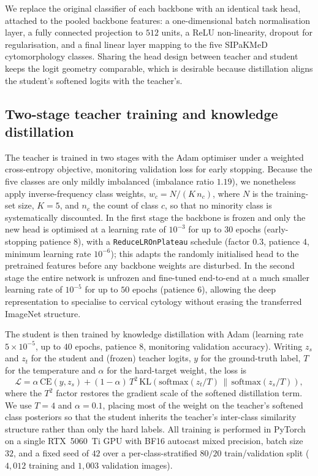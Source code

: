 \documentclass[twocolumn]{article}
\begin{document}
We replace the original classifier of each backbone with an identical task head, attached to the pooled backbone features: a one-dimensional batch normalisation layer, a fully connected projection to $512$ units, a ReLU non-linearity, dropout for regularisation, and a final linear layer mapping to the five SIPaKMeD cytomorphology classes. Sharing the head design between teacher and student keeps the logit geometry comparable, which is desirable because distillation aligns the student's softened logits with the teacher's.

\subsection{Two-stage teacher training and knowledge distillation}
The teacher is trained in two stages with the Adam optimiser under a weighted cross-entropy objective, monitoring validation loss for early stopping. Because the five classes are only mildly imbalanced (imbalance ratio $1.19$), we nonetheless apply inverse-frequency class weights, $w_c = N / (K\,n_c)$, where $N$ is the training-set size, $K=5$, and $n_c$ the count of class $c$, so that no minority class is systematically discounted. In the first stage the backbone is frozen and only the new head is optimised at a learning rate of $10^{-3}$ for up to $30$ epochs (early-stopping patience $8$), with a \texttt{ReduceLROnPlateau} schedule (factor $0.3$, patience $4$, minimum learning rate $10^{-6}$); this adapts the randomly initialised head to the pretrained features before any backbone weights are disturbed. In the second stage the entire network is unfrozen and fine-tuned end-to-end at a much smaller learning rate of $10^{-5}$ for up to $50$ epochs (patience $6$), allowing the deep representation to specialise to cervical cytology without erasing the transferred ImageNet structure.

The student is then trained by knowledge distillation \citep{hinton2015distilling} with Adam (learning rate $5\times10^{-5}$, up to $40$ epochs, patience $8$, monitoring validation accuracy). Writing $z_s$ and $z_t$ for the student and (frozen) teacher logits, $y$ for the ground-truth label, $T$ for the temperature and $\alpha$ for the hard-target weight, the loss is
\begin{equation}
\mathcal{L} = \alpha\,\mathrm{CE}\!\left(y, z_s\right) + (1-\alpha)\,T^{2}\,\mathrm{KL}\!\left(\mathrm{softmax}\!\left(z_t/T\right)\,\big\|\,\mathrm{softmax}\!\left(z_s/T\right)\right),
\end{equation}
where the $T^{2}$ factor restores the gradient scale of the softened distillation term. We use $T=4$ and $\alpha=0.1$, placing most of the weight on the teacher's softened class posteriors so that the student inherits the teacher's inter-class similarity structure rather than only the hard labels. All training is performed in PyTorch on a single RTX~5060~Ti GPU with BF16 autocast mixed precision, batch size $32$, and a fixed seed of $42$ over a per-class-stratified $80/20$ train/validation split ($4{,}012$ training and $1{,}003$ validation images).
\end{document}
